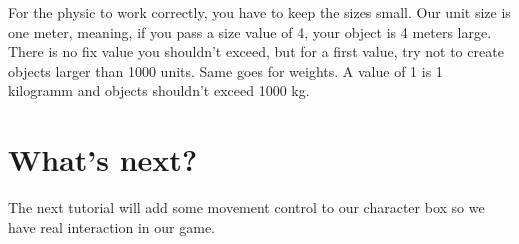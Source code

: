 \documentclass{article}
\begin{document}
For the physic to work correctly, you have to keep the sizes small. Our unit size is one meter, meaning, if you pass a size value of 4, your object is 4 meters large. There is no fix value you shouldn't exceed, but for a first value, try not to create objects larger than 1000 units. Same goes for weights. A value of 1 is 1 kilogramm and objects shouldn't exceed 1000 kg.

\section{What's next?}

The next tutorial will add some movement control to our character box so we have real interaction in our game.
\end{document}
